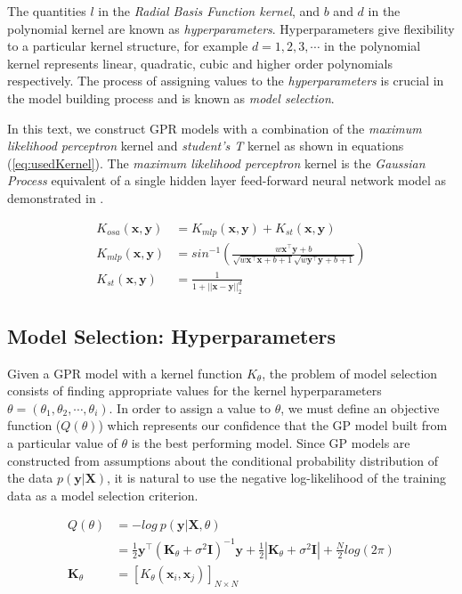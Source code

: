 \documentclass{article}
\begin{document}
The quantities $l$ in the \emph{Radial Basis Function kernel}, and $b$
and $d$ in the polynomial kernel are known as
\emph{hyperparameters}. Hyperparameters give flexibility to a
particular kernel structure, for example $d = 1, 2, 3, \cdots$ in the
polynomial kernel represents linear, quadratic, cubic and higher order
polynomials respectively. The process of assigning values to the
\emph{hyperparameters} is crucial in the model building process and is
known as \emph{model selection}. 

In this text, we construct GPR models with a combination of the
\emph{maximum likelihood perceptron} kernel and \emph{student's T}
kernel as shown in equations (\ref{eq:usedKernel}). The \emph{maximum
  likelihood perceptron} kernel is the \emph{Gaussian Process}
equivalent of a single hidden layer feed-forward neural network model
as demonstrated in \citet{Neal:1996:BLN:525544}.

\begin{align}
  K_{osa}(\mathbf{x}, \mathbf{y}) & = K_{mlp}(\mathbf{x}, \mathbf{y}) + K_{st}(\mathbf{x}, \mathbf{y}) \label{eq:usedKernel} \\
  K_{mlp}(\mathbf{x}, \mathbf{y}) & = sin^{-1}(\frac{w\mathbf{x}^\intercal \mathbf{y} + b}{\sqrt{w\mathbf{x}^\intercal \mathbf{x} + b + 1} \sqrt{w\mathbf{y}^\intercal \mathbf{y} + b + 1}}) \\
  K_{st}(\mathbf{x}, \mathbf{y}) & = \frac{1}{1 + ||\mathbf{x} - \mathbf{y}||_{2}^d}
\end{align}


\subsection{Model Selection: Hyperparameters}

Given a GPR model with a kernel function $K_\theta$, the problem of
model selection consists of finding appropriate values for the kernel
hyperparameters $\theta = \left(\theta_1, \theta_2, \cdots,
  \theta_i\right)$. In order to assign a value to $\theta$, we must
define an objective function ($Q(\theta)$) which represents our
confidence that the GP model built from a particular value of $\theta$
is the best performing model. Since GP models are constructed from
assumptions about the conditional probability distribution of the data
$p(\mathbf{y}|\mathbf{X})$, it is natural to use the negative
log-likelihood of the training data as a model selection criterion. 

\begin{align*}
  Q(\theta) & = - log \ p(\mathbf{y}|\mathbf{X}, \theta) \\
            & = \frac{1}{2} \mathbf{y}^\intercal (\mathbf{K}_\theta + \sigma^{2} \mathbf{I})^{-1} \mathbf{y} + \frac{1}{2}|\mathbf{K}_\theta + \sigma^{2} \mathbf{I}| + \frac{N}{2}log(2\pi) \\
  \mathbf{K}_\theta & = [K_{\theta}(\mathbf{x}_i, \mathbf{x}_j)]_{N \times N}
\end{align*}
\end{document}
